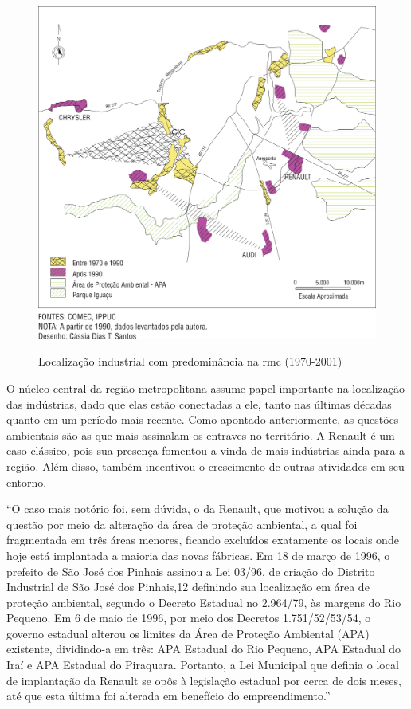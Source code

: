 	\begin{figure}
		\centering
		\caption{Localização industrial com predominância na \gls{rmc} (1970-2001)}
		\includegraphics[width=1.0\linewidth]{img/firkowski2002b_01}
		\label{fig:firkowski2002b}
	\end{figure}

	O núcleo central da região metropolitana assume papel importante na localização das indústrias, dado que elas estão conectadas a ele, tanto nas últimas décadas quanto em um período mais recente.  Como apontado anteriormente, as questões ambientais são as que mais assinalam os entraves no território. A Renault é um caso clássico, pois sua presença fomentou a vinda de mais indústrias ainda para a região. Além disso, também incentivou o crescimento de outras atividades em seu entorno. 
	
	\begin{citacao}
		``O caso mais notório foi, sem dúvida, o da Renault, que motivou a solução da questão por meio da alteração da área de proteção ambiental, a qual foi fragmentada em três áreas menores, ficando excluídos exatamente os locais onde hoje está implantada a maioria das novas fábricas. Em 18 de março de 1996, o prefeito de São José dos Pinhais assinou a Lei 03/96, de criação do Distrito Industrial de São José dos Pinhais,12 definindo sua localização em área de proteção ambiental, segundo o Decreto Estadual no 2.964/79, às margens do Rio Pequeno. Em 6 de maio de 1996, por meio dos Decretos 1.751/52/53/54, o governo estadual alterou os limites da Área de Proteção Ambiental (APA) existente, dividindo-a em três: APA Estadual do Rio Pequeno, APA Estadual do Iraí e APA Estadual do Piraquara. Portanto, a Lei Municipal que definia o local de implantação da Renault se opôs à legislação estadual por cerca de dois meses, até que esta última foi alterada em benefício do empreendimento.'' \cite[p. 96]{firkowski2002b}
	\end{citacao}

